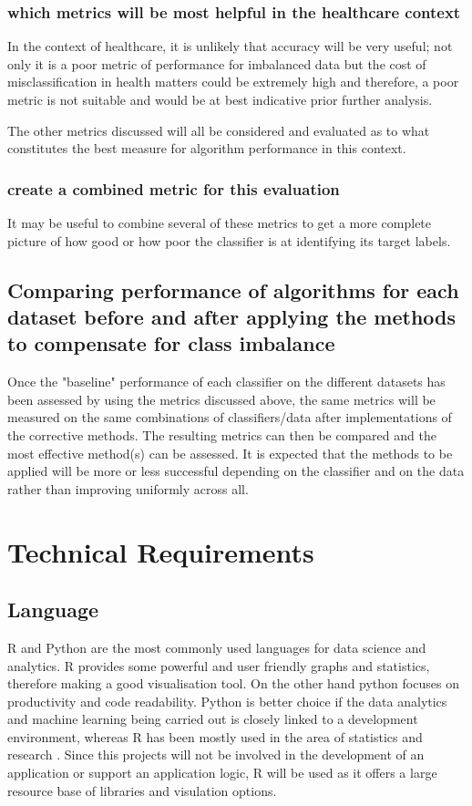 \subsubsection{which metrics will be most helpful in the healthcare context}
In the context of healthcare, it is unlikely that accuracy will be very useful; not only it is a poor metric of performance for imbalanced data but the cost of misclassification in health matters could be extremely high and therefore, a poor metric is not suitable and would be at best indicative prior further analysis.

The other metrics discussed will all be considered and evaluated as to what constitutes the best measure for algorithm performance in this context.

\subsubsection{create a combined metric for this evaluation}
It may be useful to combine several of these metrics to get a more complete picture of how good or how poor the classifier is at identifying its target labels.

\subsection{Comparing performance of algorithms for each dataset before and after applying the methods to compensate for class imbalance}
Once the "baseline" performance of each classifier on the different datasets has been assessed by using the metrics discussed above, the same metrics will be measured on the same combinations of classifiers/data after implementations of the corrective methods. 
The resulting metrics can then be compared and the most effective method(s) can be assessed. It is expected that the methods to be applied will be more or less successful depending on the classifier and on the data rather than improving uniformly across all.

\section{Technical Requirements}
\subsection{Language}
R and Python are the most commonly used languages for data science and analytics. R provides some powerful and user friendly graphs and statistics, therefore making a good visualisation tool. On the other hand python focuses on productivity and code readability.
Python is better choice if the data analytics and machine learning being carried out is closely linked to a development environment, whereas R has been mostly used in the area of statistics and research \citep{Willems:2015wi}.
Since this projects will not be involved in the development of an application or support an application logic, R will be used as it offers a large resource base of libraries and visulation options.

